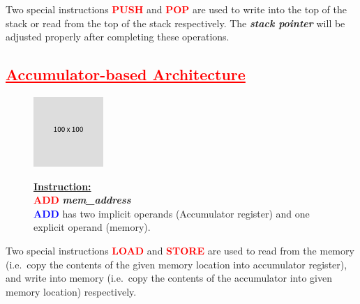 \documentclass[
  16pt,
  a4paper,
]{report}
\begin{document}
\begin{tcolorbox}[colback=boxbodycol, colframe=boxbodycol]
Two special instructions \textcolor{red}{\textbf{PUSH}} and
\textcolor{red}{\textbf{POP}} are used to write into the top of the
stack or read from the top of the stack respectively. The
\textbf{\emph{stack pointer}} will be adjusted properly after completing
these operations.

\end{tcolorbox}

\subsection{\texorpdfstring{\textcolor{red}{\underline{Accumulator-based Architecture}}}{}}\label{section-1}

\begin{figure}[H]

\begin{minipage}{0.40\linewidth}

\includegraphics{index_files/mediabag/FiKGhYhhIWJYiBgWIoaF.png}\end{minipage}%
%
\begin{minipage}{0.60\linewidth}

\begin{tcolorbox}[colback=boxbodycol, colframe=boxbodycol]
\textbf{\underline{Instruction:}}\\
\textcolor{red}{\textbf{ADD}} \textbf{\emph{mem\_address}}\\
\textcolor{blue}{\textbf{ADD}} has two implicit operands (Accumulator
register) and one explicit operand (memory).

\end{tcolorbox}

\end{minipage}%

\end{figure}%

\begin{tcolorbox}[colback=boxbodycol, colframe=boxbodycol]
Two special instructions \textcolor{red}{\textbf{LOAD}} and
\textcolor{red}{\textbf{STORE}} are used to read from the memory
(i.e.~copy the contents of the given memory location into accumulator
register), and write into memory (i.e.~copy the contents of the
accumulator into given memory location) respectively.

\end{tcolorbox}
\end{document}
